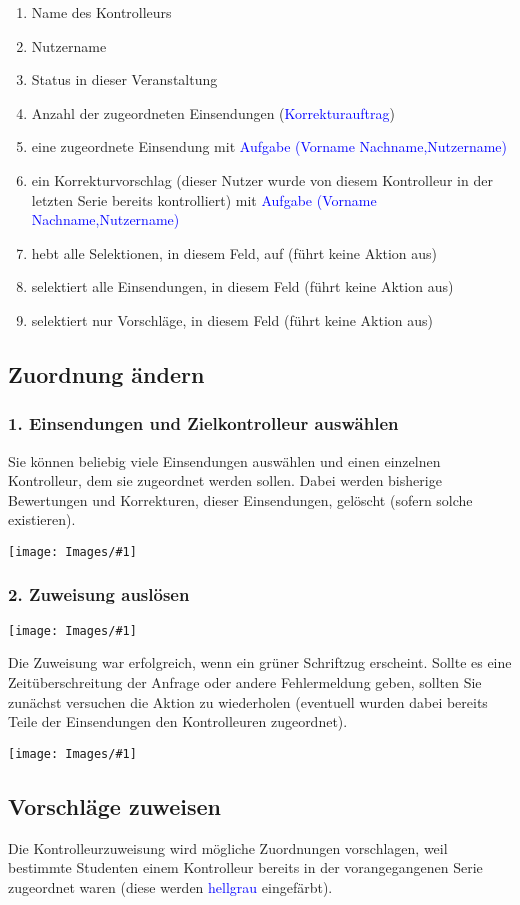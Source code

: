 \documentclass[12pt,a4paper,final]{scrartcl}
\numberwithin{equation}{section}
\newcommand{\blau}[1]{\textcolor{blue}{#1}}
\newenvironment{Bilder}
  {\par\raggedbottom\null\noindent\minipage{\textwidth}\centering}
  {\endminipage\vspace{0.7cm}}
\newcommand{\tbild}[1]{%
\begin{Bilder}
 \texttt{[image: Images/\#1]}
	\end{Bilder}
}
\begin{document}
\begin{enumerate}
\item Name des Kontrolleurs
\item Nutzername
\item Status in dieser Veranstaltung
\item Anzahl der zugeordneten Einsendungen (\blau{Korrekturauftrag})
\item eine zugeordnete Einsendung mit \blau{Aufgabe (Vorname Nachname,Nutzername)}
\item ein Korrekturvorschlag (dieser Nutzer wurde von diesem Kontrolleur in der letzten Serie bereits kontrolliert) mit \blau{Aufgabe (Vorname Nachname,Nutzername)}
\item hebt alle Selektionen, in diesem Feld, auf (führt keine Aktion aus)
\item selektiert alle Einsendungen, in diesem Feld (führt keine Aktion aus)
 \item selektiert nur Vorschläge, in diesem Feld (führt keine Aktion aus)
\end{enumerate}


\subsection{Zuordnung ändern}
\subsubsection*{1. Einsendungen und Zielkontrolleur auswählen}
Sie können beliebig viele Einsendungen auswählen und einen einzelnen Kontrolleur, dem sie zugeordnet werden sollen. Dabei werden bisherige Bewertungen und Korrekturen, dieser Einsendungen, gelöscht (sofern solche existieren). 
\tbild{manA.png}
\subsubsection*{2. Zuweisung auslösen}
\tbild{manB.png}
Die Zuweisung war erfolgreich, wenn ein grüner Schriftzug erscheint. Sollte es eine Zeitüberschreitung der Anfrage oder andere Fehlermeldung geben, sollten Sie zunächst versuchen die Aktion zu wiederholen (eventuell wurden dabei bereits Teile der Einsendungen den Kontrolleuren zugeordnet).
\tbild{manC.png}

\subsection{Vorschläge zuweisen}
Die Kontrolleurzuweisung wird mögliche Zuordnungen vorschlagen, weil bestimmte Studenten einem Kontrolleur bereits in der vorangegangenen Serie zugeordnet waren (diese werden \blau{hellgrau} eingefärbt).
\end{document}
